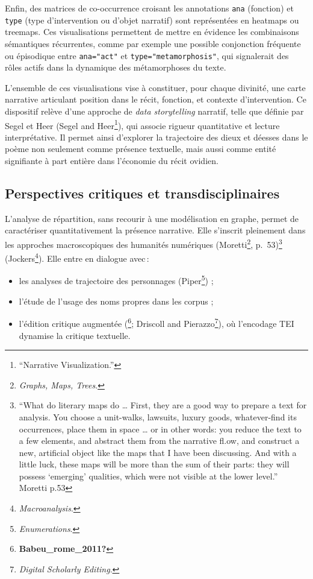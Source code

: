 \documentclass[
  letterpaper,
  DIV=11,
  numbers=noendperiod]{scrreprt}
\begin{document}
Enfin, des matrices de co-occurrence croisant les annotations
\texttt{ana} (fonction) et \texttt{type} (type d'intervention ou d'objet
narratif) sont représentées en heatmaps ou treemaps. Ces visualisations
permettent de mettre en évidence les combinaisons sémantiques
récurrentes, comme par exemple une possible conjonction fréquente ou
épisodique entre \texttt{ana="act"} et \texttt{type="metamorphosis"},
qui signalerait des rôles actifs dans la dynamique des métamorphoses du
texte.

L'ensemble de ces visualisations vise à constituer, pour chaque
divinité, une carte narrative articulant position dans le récit,
fonction, et contexte d'intervention. Ce dispositif relève d'une
approche de \emph{data storytelling} narratif, telle que définie par
Segel et Heer (Segel and Heer\footnote{{``Narrative Visualization.''}}),
qui associe rigueur quantitative et lecture interprétative. Il permet
ainsi d'explorer la trajectoire des dieux et déesses dans le poème non
seulement comme présence textuelle, mais aussi comme entité signifiante
à part entière dans l'économie du récit ovidien.

\subsection{Perspectives critiques et
transdisciplinaires}\label{perspectives-critiques-et-transdisciplinaires}

L'analyse de répartition, sans recourir à une modélisation en graphe,
permet de caractériser quantitativement la présence narrative. Elle
s'inscrit pleinement dans les approches macroscopiques des humanités
numériques (Moretti\footnote{\emph{Graphs, Maps, Trees}.},
p.~53)\footnote{``What do literary maps do \ldots{} First, they are a
  good way to prepare a text for analysis. You choose a unit-walks,
  lawsuits, luxury goods, whatever-find its occurrences, place them in
  space \ldots{} or in other words: you reduce the text to a few
  elements, and abstract them from the narrative fl.ow, and construct a
  new, artificial object like the maps that I have been discussing. And
  with a little luck, these maps will be more than the sum of their
  parts: they will possess `emerging' qualities, which were not visible
  at the lower level.'' Moretti{} p.53} (Jockers\footnote{\emph{Macroanalysis}.}).
Elle entre en dialogue avec\,:

\begin{itemize}
\item
  les analyses de trajectoire des personnages (Piper\footnote{\emph{Enumerations}.})
  ;
\item
  l'étude de l'usage des noms propres dans les corpus ;
\item
  l'édition critique augmentée (\footnote{\textbf{Babeu\_rome\_2011?}};
  Driscoll and Pierazzo\footnote{\emph{Digital Scholarly Editing}.}), où
  l'encodage TEI dynamise la critique textuelle.
\end{itemize}
\end{document}
